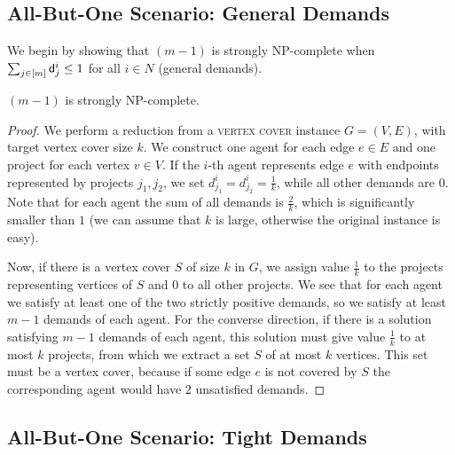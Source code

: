 \documentclass{article}
\begin{document}
\subsection{All-But-One Scenario: General Demands}

We begin by showing that \AAS$(m-1)$ is strongly NP-complete when  $\sum_{j\in [m]} {\sf d}^i_j \le 1$ for all $i\in N$ (general demands).

\begin{theorem}\label{thm:mminus1h} 
\AAS$(m-1)$ is strongly NP-complete.  
\end{theorem}

\begin{proof}

We perform a reduction from a \textsc{vertex cover} instance $G=(V,E)$, with target vertex cover size $k$. We
construct one agent for each edge $e\in E$ and one project for each
vertex $v\in V$. If the $i$-th agent represents edge $e$ with endpoints represented by projects $j_1,j_2$, we set $d^i_{j_1}=d^i_{j_2}=\frac{1}{k}$, while all other demands are $0$. Note that for each agent the sum of all demands is $\frac{2}{k}$, which is significantly smaller than $1$ (we can assume that $k$ is large, otherwise the original instance is easy). 

Now, if there is a vertex cover $S$ of size $k$ in $G$, we assign value $\frac{1}{k}$ to the projects representing vertices of $S$ and $0$ to all other projects. We see that for each agent we satisfy at least one of the two strictly positive demands, so we satisfy at least $m-1$ demands of each agent. For the converse direction, if there is a solution satisfying $m-1$ demands of each agent, this solution must give value $\frac{1}{k}$ to at most $k$ projects, from which we extract a set $S$ of at most $k$ vertices. This set must be a vertex cover, because if some edge $e$ is not covered by $S$ the corresponding agent would have $2$ unsatisfied demands.
\end{proof}

\subsection{All-But-One Scenario: Tight Demands}
\end{document}
